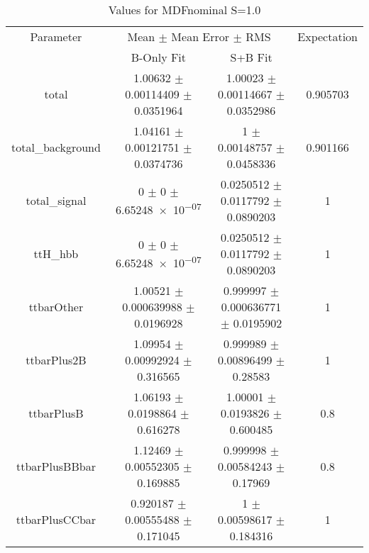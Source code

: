 \begin{table}
\centering
\caption{Values for MDFnominal S=1.0}
\begin{tabular}{cccc}
\toprule
Parameter & \multicolumn{2}{c}{Mean $\pm$ Mean Error $\pm$ RMS} & Expectation\\
 & B-Only Fit & S+B Fit & \\
\midrule
total & \num{1.00632} $\pm$ \num{0.00114409} $\pm$ \num{0.0351964} & \num{1.00023} $\pm$ \num{0.00114667} $\pm$ \num{0.0352986} & \num{0.905703}\\
total\_background & \num{1.04161} $\pm$ \num{0.00121751} $\pm$ \num{0.0374736} & \num{1} $\pm$ \num{0.00148757} $\pm$ \num{0.0458336} & \num{0.901166}\\
total\_signal & \num{0} $\pm$ \num{0} $\pm$ \num{6.65248e-07} & \num{0.0250512} $\pm$ \num{0.0117792} $\pm$ \num{0.0890203} & \num{1}\\
ttH\_hbb & \num{0} $\pm$ \num{0} $\pm$ \num{6.65248e-07} & \num{0.0250512} $\pm$ \num{0.0117792} $\pm$ \num{0.0890203} & \num{1}\\
ttbarOther & \num{1.00521} $\pm$ \num{0.000639988} $\pm$ \num{0.0196928} & \num{0.999997} $\pm$ \num{0.000636771} $\pm$ \num{0.0195902} & \num{1}\\
ttbarPlus2B & \num{1.09954} $\pm$ \num{0.00992924} $\pm$ \num{0.316565} & \num{0.999989} $\pm$ \num{0.00896499} $\pm$ \num{0.28583} & \num{1}\\
ttbarPlusB & \num{1.06193} $\pm$ \num{0.0198864} $\pm$ \num{0.616278} & \num{1.00001} $\pm$ \num{0.0193826} $\pm$ \num{0.600485} & \num{0.8}\\
ttbarPlusBBbar & \num{1.12469} $\pm$ \num{0.00552305} $\pm$ \num{0.169885} & \num{0.999998} $\pm$ \num{0.00584243} $\pm$ \num{0.17969} & \num{0.8}\\
ttbarPlusCCbar & \num{0.920187} $\pm$ \num{0.00555488} $\pm$ \num{0.171045} & \num{1} $\pm$ \num{0.00598617} $\pm$ \num{0.184316} & \num{1}\\
\bottomrule
\end{tabular}
\end{table}